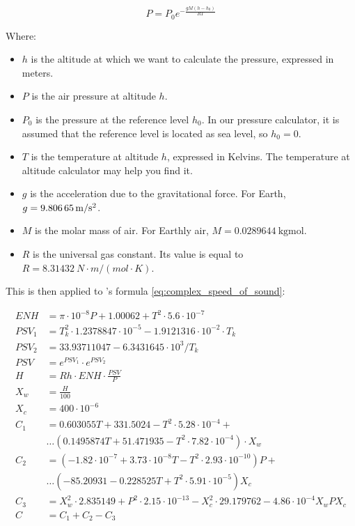         \begin{equation}\label{eq:barometric_formula}
            P = P_0 e^{-\frac{gM(h - h_0)}{RT}}
        \end{equation}
            
        Where:
        \begin{itemize}
            \item $h$ is the altitude at which we want to calculate the pressure, expressed in meters.
            \item $P$ is the air pressure at altitude $h$.
            \item $P_0$ is the pressure at the reference level $h_0$. In our pressure calculator, it is assumed that the reference level is located as sea level, so $h_0 = 0$.
            \item $T$ is the temperature at altitude $h$, expressed in Kelvins. The temperature at altitude calculator may help you find it.
            \item $g$ is the acceleration due to the gravitational force. For Earth, $g = \SI{9.80665}{\m/s\squared}$.
            \item $M$ is the molar mass of air. For Earthly air, $M = \SI{0.0289644}{\kg\mol}$.
            \item $R$ is the universal gas constant. Its value is equal to $R = \SI{8.31432}{N \cdot m/(mol \cdot K)}$.
        \end{itemize}

        This is then applied to \citeauthor{cramer1993}'s formula \eqref{eq:complex_speed_of_sound}:

        \begin{equation}\label{eq:complex_speed_of_sound}
            \begin{aligned}
            ENH &= \pi \cdot 10^{-8}P + 1.00062 + T^2 \cdot 5.6 \cdot 10^{-7} \\
            PSV_1 &= T_k^2 \cdot 1.2378847 \cdot 10^{-5} - 1.9121316 \cdot 10^{-2} \cdot T_k \\
            PSV_2 &= 33.93711047 - 6.3431645 \cdot 10^3 / T_k \\
            PSV &= e^{PSV_1} \cdot e^{PSV_2} \\
            H &= Rh \cdot ENH \cdot \frac{PSV}{P} \\
            X_w &= \frac{H}{100} \\
            X_c &= 400 \cdot 10^{-6} \\
            C_1 &= 0.603055T + 331.5024 - T^2 \cdot 5.28 \cdot 10^{-4} + \\ & \ldots (0.1495874T + 51.471935 - T^2 \cdot 7.82 \cdot 10^{-4}) \cdot X_w \\
            C_2 &= (-1.82 \cdot 10^{-7} + 3.73 \cdot 10^{-8}T - T^2 \cdot 2.93 \cdot 10^{-10})P + \\ & \ldots (-85.20931 - 0.228525T + T^2 \cdot 5.91 \cdot 10^{-5})X_c \\
            C_3 &= X_w^2 \cdot 2.835149 + P^2 \cdot 2.15 \cdot 10^{-13} - X_c^2 \cdot 29.179762 - 4.86 \cdot 10^{-4}X_wPX_c \\
            C &= C_1 + C_2 - C_3
            \end{aligned}
        \end{equation}

